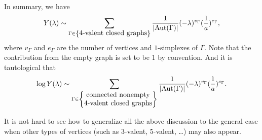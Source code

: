 \documentclass{article}
\newtheorem{main theorem}[defn]{Main Theorem}
\begin{document}
In summary, we have
$$Y(\lambda)\sim \sum_{\Gamma\in\left\{\mbox{$4$-valent closed graphs}\right\}}
{1\over |\mathrm{Aut}(\Gamma)|}(-\lambda)^{v_\Gamma}({1\over
a})^{e_\Gamma},$$ where $v_\Gamma$ and $e_\Gamma$ are the number
of vertices and $1$-simplexes of $\Gamma$. Note that the
contribution from the empty graph is set to be $1$ by convention.
And it is tautological that
\begin{eqnarray}
\log Y(\lambda) \sim \sum_{\Gamma\in\left\{
\begin{matrix} \mbox{connected nonempty}\\
\mbox{$4$-valent closed graphs}
\end{matrix}
 \right\}}{1\over
|\mathrm{Aut}(\Gamma)|}(-\lambda)^{v_\Gamma}({1\over
a})^{e_\Gamma}.
\end{eqnarray}

It is not hard to see how to generalize all the above discussion
to the general case when other types of vertices (such as $3$-valent,
$5$-valent, \ldots) may also appear.
\end{document}
